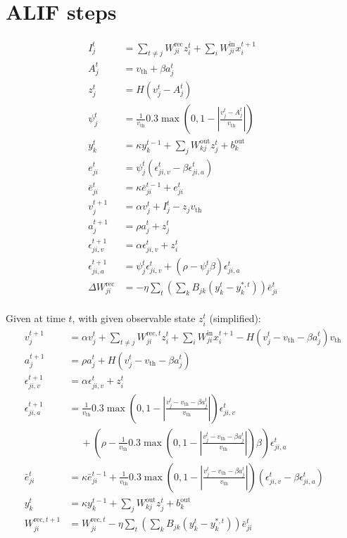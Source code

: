 \documentclass{article}
\begin{document}
\section{ALIF steps}
\begin{align}
I^t_j &= \sum_{t\neq j} W^\text{rec}_{ji} z_i^t + \sum_i W^\text{in}_{ji}x_i^{t+1} \\
A^t_j &= v_\text{th}+\beta a^t_j\\
z^t_j &= H\left(v_j^t-A_j^t\right)\\
\psi^t_j &= \frac{1}{v_\text{th}}0.3\max\left(0, 1-\left|\frac{v_j^t-A^t_j}{v_\text{th}}\right|\right)\\
y^t_k &= \kappa y^{t-1}_k + \sum_j W^\text{out}_{kj}z^t_j+b^\text{out}_k\\
e^t_{ji} &= \psi^t_j\left(\epsilon^t_{ji,v} - \beta\epsilon^t_{ji,a}\right)\\
\bar{e}^t_{ji} &= \kappa\bar{e}^{t-1}_{ji} + e^t_{ji}\\
v^{t+1}_j &= \alpha v_j^t + I_j^t-z_jv_\text{th}\\
a^{t+1}_j &= \rho a_j^t + z_j^t\\
\epsilon_{ji,v}^{t+1} &= \alpha\epsilon_{ji,v}^t + z_i^t\\
\epsilon_{ji,a}^{t+1} &= \psi^t_j\epsilon^t_{ji,v} + \left(\rho-\psi^t_j\beta\right)\epsilon^t_{ji,a}\\
\Delta W^\text{rec}_{ji} &= -\eta\sum_t\left(\sum_kB_{jk}\left(y_k^t-y_k^{*,t}\right)\right)\bar{e}^t_{ji}\\
\end{align}

Given at time $t$, with given observable state $z_i^t$ (simplified):
\begin{align}
v^{t+1}_j &= \alpha v_j^t + \sum_{t\neq j} W^{\text{rec}, t}_{ji} z_i^t + \sum_i W^\text{in}_{ji}x_i^{t+1} - H\left(v_j^t-v_\text{th}-\beta a^t_j\right)v_\text{th}\\
a^{t+1}_j &= \rho a_j^t + H\left(v_j^t-v_\text{th}-\beta a^t_j\right)\\
\epsilon_{ji,v}^{t+1} &= \alpha\epsilon_{ji,v}^t + z_i^t\\
\epsilon_{ji,a}^{t+1} &= \frac{1}{v_\text{th}}0.3\max\left(0, 1-\left|\frac{v_j^t-v_\text{th}-\beta a^t_j}{v_\text{th}}\right|\right)\epsilon^t_{ji,v} \\ &\quad \ + \left(\rho-\frac{1}{v_\text{th}}0.3\max\left(0, 1-\left|\frac{v_j^t-v_\text{th}-\beta a^t_j}{v_\text{th}}\right|\right)\beta\right)\epsilon^t_{ji,a}\\
\bar{e}^t_{ji} &= \kappa\bar{e}^{t-1}_{ji} + \frac{1}{v_\text{th}}0.3\max\left(0, 1-\left|\frac{v_j^t-v_\text{th}-\beta a^t_j}{v_\text{th}}\right|\right)\left(\epsilon^t_{ji,v} - \beta\epsilon^t_{ji,a}\right)\\
y^t_k &= \kappa y^{t-1}_k + \sum_j W^\text{out}_{kj}z^t_j+b^\text{out}_k\\
W^{\text{rec}, t+1}_{ji} &= W^{\text{rec}, t}_{ji} -\eta\sum_t\left(\sum_kB_{jk}\left(y_k^t-y_k^{*,t}\right)\right)\bar{e}^t_{ji}\\
\end{align}
\end{document}
